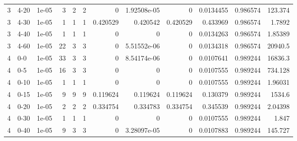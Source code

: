 \begin{tabular}{rlrrrrrrrrrr}
     3 & 4-20   &      1e-05 &           3 &                 2 &                 2 &     0           &     1.92508e-05 &      0           &        0.0134455 &               0.986574 &         123.374    \\
     3 & 4-30   &      1e-05 &           1 &                 1 &                 1 &     0.420529    &     0.420542    &      0.420529    &        0.433969  &               0.986574 &           1.7892   \\
     3 & 4-40   &      1e-05 &           1 &                 1 &                 1 &     0           &     0           &      0           &        0.0134263 &               0.986574 &           1.85389  \\
     3 & 4-60   &      1e-05 &          22 &                 3 &                 3 &     0           &     5.51552e-06 &      0           &        0.0134318 &               0.986574 &       20940.5      \\
     4 & 0-0    &      1e-05 &          33 &                 3 &                 3 &     0           &     8.54174e-06 &      0           &        0.0107641 &               0.989244 &       16836.3      \\
     4 & 0-5    &      1e-05 &          16 &                 3 &                 3 &     0           &     0           &      0           &        0.0107555 &               0.989244 &         734.128    \\
     4 & 0-10   &      1e-05 &           1 &                 1 &                 1 &     0           &     0           &      0           &        0.0107555 &               0.989244 &           1.96031  \\
     4 & 0-15   &      1e-05 &           9 &                 9 &                 9 &     0.119624    &     0.119624    &      0.119624    &        0.130379  &               0.989244 &        1534.6      \\
     4 & 0-20   &      1e-05 &           2 &                 2 &                 2 &     0.334754    &     0.334783    &      0.334754    &        0.345539  &               0.989244 &           2.04398  \\
     4 & 0-30   &      1e-05 &           1 &                 1 &                 1 &     0           &     0           &      0           &        0.0107555 &               0.989244 &           1.847    \\
     4 & 0-40   &      1e-05 &           9 &                 3 &                 3 &     0           &     3.28097e-05 &      0           &        0.0107883 &               0.989244 &         145.727    \\

\end{tabular}
